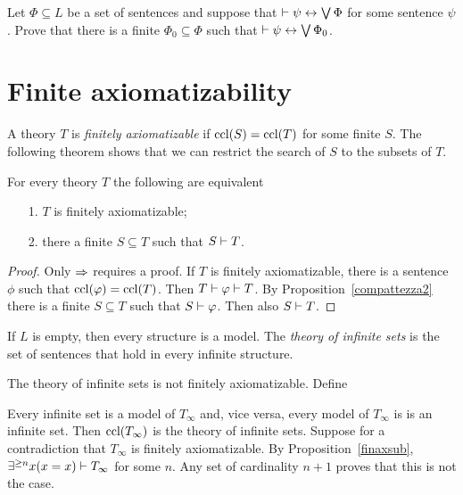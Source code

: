 \documentclass[creche.tex]{subfiles}
\begin{document}
\begin{exercise}
Let $\Phi\subseteq L$ be a set of sentences and suppose that $\vdash\psi\leftrightarrow\bigvee\Phi$ for some sentence $\psi$. Prove that there is a finite $\Phi_0\subseteq\Phi$ such that  $\vdash\psi\leftrightarrow\bigvee\Phi_0$.\QED
\end{exercise}

\section{Finite axiomatizability}

A theory $T$ is \emph{finitely axiomatizable\/} if ${\rm ccl}(S)={\rm ccl}(T)$ for some finite $S$. The following theorem shows that we can restrict the search of $S$ to the subsets of $T$.

\begin{proposition}\label{finaxsub} For every theory $T$ the following are equivalent
\begin{itemize}
\item[1.] $T$ is finitely axiomatizable;
\item[2.] there a finite $S\subseteq T$ such that $S\vdash T$.
\end{itemize}
\end{proposition}

\begin{proof}
Only $\Rightarrow$ requires a proof. If $T$ is finitely axiomatizable, there is a sentence $\phi$ such that ${\rm ccl}(\varphi)={\rm ccl}(T)$. Then $T\vdash\varphi\vdash T$. By Proposition~\ref{compattezza2} there is a finite $S\subseteq T$ such that $S\vdash\varphi$. Then also $S\vdash T$.
\end{proof}

If $L$ is empty, then every structure is a model. The \emph{theory of infinite sets\/} is the set of sentences that hold in every infinite structure.

\begin{example} 
The theory of infinite sets is not finitely axiomatizable. Define


Every infinite set is a model of $T_{\infty}$ and, vice versa, every model of $T_{\infty}$ is is an infinite set. Then ${\rm ccl}(T_{\infty})$ is the theory of infinite sets. Suppose for a contradiction that $T_{\infty}$ is finitely axiomatizable. By Proposition~\ref{finaxsub}, $\exists^{\ge n}x (x=x)\vdash T_{\infty}$ for some $n$. Any set of cardinality $n+1$ proves that this is not the case.\QED
\end{example}
\end{document}

